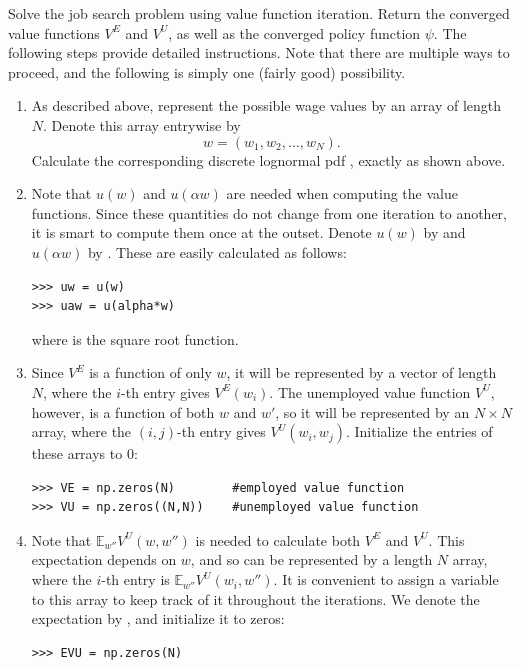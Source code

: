 \begin{problem}
Solve the job search problem using value function iteration. Return the converged value functions
$V^E$ and $V^U$, as well as the converged policy function $\psi$. The following steps provide detailed
instructions. Note that there are multiple ways to proceed, and the following is simply one (fairly good) 
possibility.
\begin{enumerate}

   \item As described above, represent the possible wage values by an array  of length
   $N$. Denote this array entrywise by
   \[
   w = (w_1,w_2,\ldots,w_N).
   \]
   Calculate the corresponding discrete lognormal pdf , exactly as shown above.
   
   \item Note that $u(w)$ and $u(\alpha w)$ are needed when computing the value functions.
   Since these quantities do not change from one iteration to another, it is smart to 
   compute them once at the outset. Denote $u(w)$ by  and $u(\alpha w)$ by .
   These are easily calculated as follows:
\begin{lstlisting}
>>> uw = u(w)
>>> uaw = u(alpha*w)
\end{lstlisting}
    where  is the square root function.
   
   \item Since $V^E$ is a function of only $w$, it will be represented by a vector of length $N$, where
   the $i$-th entry gives $V^E(w_i)$. The unemployed value function $V^U$, however,
   is a function of both $w$ and $w'$, so it will be represented by an $N \times N$ array,
   where the $(i,j)$-th entry gives $V^U(w_i,w_j)$. Initialize the entries of these arrays to 0:
\begin{lstlisting}
>>> VE = np.zeros(N)        #employed value function
>>> VU = np.zeros((N,N))    #unemployed value function
\end{lstlisting}
   
   \item Note that $\mathbb{E}_{w''}V^U(w,w'')$  is needed to calculate both $V^E$ and $V^U$.
   This expectation depends on $w$, and so can be represented by a length $N$ array, where the
   $i$-th entry is $\mathbb{E}_{w''}V^U(w_i,w'')$.
   It is convenient to assign a variable to this array to keep track of it throughout the iterations.
   We denote the expectation by , and initialize it to zeros:
\begin{lstlisting}
>>> EVU = np.zeros(N)
\end{lstlisting}
   

\end{enumerate}
\end{problem}
